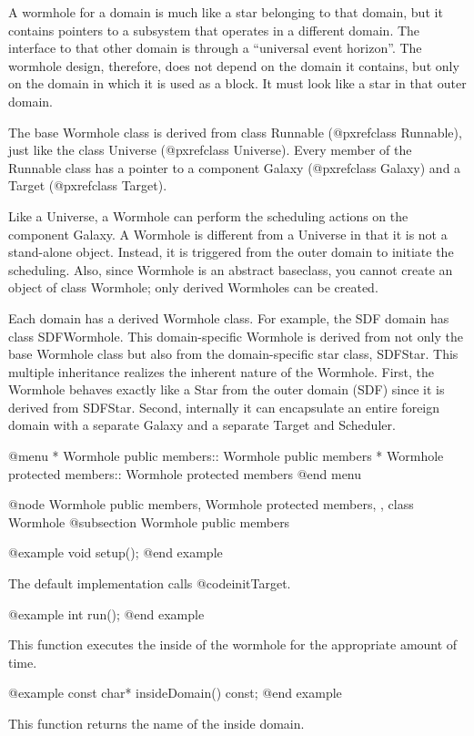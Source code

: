A wormhole for a domain is much like a star belonging to that domain,
but it contains pointers to a subsystem that operates in a different
domain.  The interface to that other domain is through a ``universal
event horizon''.  The wormhole design, therefore, does not depend on the
domain it contains, but only on the domain in which it is used as a
block.  It must look like a star in that outer domain.

The base Wormhole class is derived from
class Runnable (@pxref{class Runnable}), just like the
class Universe (@pxref{class Universe}).
Every member of the Runnable class has a pointer to a
component Galaxy (@pxref{class Galaxy}) and a Target (@pxref{class
Target}).

Like a Universe, a Wormhole can perform
the scheduling actions on the component Galaxy. A Wormhole is different
from a Universe in that it is not a stand-alone object.  Instead, it is
triggered from the outer domain to initiate the scheduling.  Also, since
Wormhole is an abstract baseclass, you cannot create an object of class
Wormhole; only derived Wormholes can be created.

Each domain has a derived Wormhole class.  For example, the SDF domain
has class SDFWormhole.  This domain-specific Wormhole is derived from
not only the base Wormhole class but also from the domain-specific star
class, SDFStar.  This multiple inheritance realizes the inherent nature
of the Wormhole.  First, the Wormhole behaves exactly like a Star from
the outer domain (SDF) since it is derived from SDFStar.  Second,
internally it can encapsulate an entire foreign domain with a separate
Galaxy and a separate Target and Scheduler.

@menu
* Wormhole public members::  Wormhole public members
* Wormhole protected members::  Wormhole protected members
@end menu

@node Wormhole public members, Wormhole protected members,  , class Wormhole
@subsection Wormhole public members

@example
void setup();
@end example

The default implementation calls @code{initTarget}.

@example
int run();
@end example

This function executes the inside of the wormhole for the appropriate
amount of time.

@example
const char* insideDomain() const;
@end example

This function returns the name of the inside domain.

